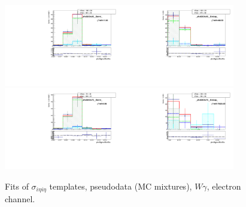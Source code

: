 \begin{figure}[htb]
\begin{center}
   \includegraphics[width=0.45\textwidth]{../figs/figs_v11/ELECTRON_WGamma/TemplateFits/c_TEMPL_SIHIH_UNblind__phoEt55to65__Barrel__RooFit_MCclosure.pdf}\includegraphics[width=0.45\textwidth]{../figs/figs_v11/ELECTRON_WGamma/TemplateFits/c_TEMPL_SIHIH_UNblind__phoEt55to65__Endcap__RooFit_MCclosure.pdf}\\
   \includegraphics[width=0.45\textwidth]{../figs/figs_v11/ELECTRON_WGamma/TemplateFits/c_TEMPL_SIHIH_UNblind__phoEt65to75__Barrel__RooFit_MCclosure.pdf}\includegraphics[width=0.45\textwidth]{../figs/figs_v11/ELECTRON_WGamma/TemplateFits/c_TEMPL_SIHIH_UNblind__phoEt65to75__Endcap__RooFit_MCclosure.pdf}\\
  \label{fig:templateFits_MCclosure_SIHIH_ELECTRON_2}
  \caption{Fits of $\sigma_{i \eta i \eta}$ templates, pseudodata (MC mixtures), $W\gamma$, electron channel.}
  \end{center}
\end{figure}

